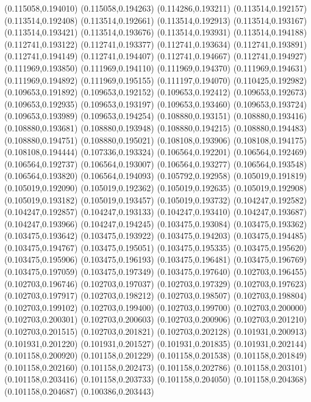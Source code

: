 (0.115058,0.194010)
(0.115058,0.194263)
(0.114286,0.193211)
(0.113514,0.192157)
(0.113514,0.192408)
(0.113514,0.192661)
(0.113514,0.192913)
(0.113514,0.193167)
(0.113514,0.193421)
(0.113514,0.193676)
(0.113514,0.193931)
(0.113514,0.194188)
(0.112741,0.193122)
(0.112741,0.193377)
(0.112741,0.193634)
(0.112741,0.193891)
(0.112741,0.194149)
(0.112741,0.194407)
(0.112741,0.194667)
(0.112741,0.194927)
(0.111969,0.193850)
(0.111969,0.194110)
(0.111969,0.194370)
(0.111969,0.194631)
(0.111969,0.194892)
(0.111969,0.195155)
(0.111197,0.194070)
(0.110425,0.192982)
(0.109653,0.191892)
(0.109653,0.192152)
(0.109653,0.192412)
(0.109653,0.192673)
(0.109653,0.192935)
(0.109653,0.193197)
(0.109653,0.193460)
(0.109653,0.193724)
(0.109653,0.193989)
(0.109653,0.194254)
(0.108880,0.193151)
(0.108880,0.193416)
(0.108880,0.193681)
(0.108880,0.193948)
(0.108880,0.194215)
(0.108880,0.194483)
(0.108880,0.194751)
(0.108880,0.195021)
(0.108108,0.193906)
(0.108108,0.194175)
(0.108108,0.194444)
(0.107336,0.193324)
(0.106564,0.192201)
(0.106564,0.192469)
(0.106564,0.192737)
(0.106564,0.193007)
(0.106564,0.193277)
(0.106564,0.193548)
(0.106564,0.193820)
(0.106564,0.194093)
(0.105792,0.192958)
(0.105019,0.191819)
(0.105019,0.192090)
(0.105019,0.192362)
(0.105019,0.192635)
(0.105019,0.192908)
(0.105019,0.193182)
(0.105019,0.193457)
(0.105019,0.193732)
(0.104247,0.192582)
(0.104247,0.192857)
(0.104247,0.193133)
(0.104247,0.193410)
(0.104247,0.193687)
(0.104247,0.193966)
(0.104247,0.194245)
(0.103475,0.193084)
(0.103475,0.193362)
(0.103475,0.193642)
(0.103475,0.193922)
(0.103475,0.194203)
(0.103475,0.194485)
(0.103475,0.194767)
(0.103475,0.195051)
(0.103475,0.195335)
(0.103475,0.195620)
(0.103475,0.195906)
(0.103475,0.196193)
(0.103475,0.196481)
(0.103475,0.196769)
(0.103475,0.197059)
(0.103475,0.197349)
(0.103475,0.197640)
(0.102703,0.196455)
(0.102703,0.196746)
(0.102703,0.197037)
(0.102703,0.197329)
(0.102703,0.197623)
(0.102703,0.197917)
(0.102703,0.198212)
(0.102703,0.198507)
(0.102703,0.198804)
(0.102703,0.199102)
(0.102703,0.199400)
(0.102703,0.199700)
(0.102703,0.200000)
(0.102703,0.200301)
(0.102703,0.200603)
(0.102703,0.200906)
(0.102703,0.201210)
(0.102703,0.201515)
(0.102703,0.201821)
(0.102703,0.202128)
(0.101931,0.200913)
(0.101931,0.201220)
(0.101931,0.201527)
(0.101931,0.201835)
(0.101931,0.202144)
(0.101158,0.200920)
(0.101158,0.201229)
(0.101158,0.201538)
(0.101158,0.201849)
(0.101158,0.202160)
(0.101158,0.202473)
(0.101158,0.202786)
(0.101158,0.203101)
(0.101158,0.203416)
(0.101158,0.203733)
(0.101158,0.204050)
(0.101158,0.204368)
(0.101158,0.204687)
(0.100386,0.203443)

